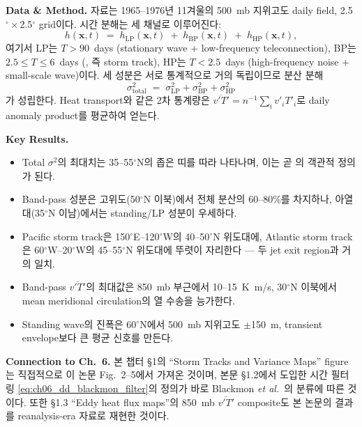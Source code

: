 \medskip
\noindent\textbf{Data \& Method.}\quad
자료는 1965--1976년 11겨울의 500~mb 지위고도 daily field, 2.5$^\circ\times$2.5$^\circ$ grid이다.
시간 분해는 세 채널로 이루어진다:
\begin{equation}\label{eq:ch06_dd_blackmon_filter}
  h(\mathbf{x},t) \;=\; h_{\mathrm{LP}}(\mathbf{x},t)
  \;+\; h_{\mathrm{BP}}(\mathbf{x},t)
  \;+\; h_{\mathrm{HP}}(\mathbf{x},t),
\end{equation}
여기서 LP는 $T>90$~days (stationary wave + low-frequency teleconnection),
BP는 $2.5\le T\le 6$~days (, 즉 storm track),
HP는 $T<2.5$~days (high-frequency noise + small-scale wave)이다.
세 성분은 서로 통계적으로 거의 독립이므로 분산 분해
\begin{equation}\label{eq:ch06_dd_blackmon_variance}
  \sigma^2_{\text{total}}
  \;=\; \sigma^2_{\mathrm{LP}}
  + \sigma^2_{\mathrm{BP}}
  + \sigma^2_{\mathrm{HP}}
\end{equation}
가 성립한다.  Heat transport와 같은 2차 통계량은
$\overline{v'T'} = n^{-1}\sum_i v'_i T'_i$로 daily anomaly product를 평균하여 얻는다.

\medskip
\noindent\textbf{Key Results.}
\begin{itemize}
  \item Total $\sigma^2$의 최대치는 35--55$^\circ$N의 좁은 띠를 따라 나타나며,
        이는 곧 의 객관적 정의가 된다.
  \item Band-pass 성분은 고위도(50$^\circ$N 이북)에서 전체 분산의 60--80\%를 차지하나,
        아열대(35$^\circ$N 이남)에서는 standing/LP 성분이 우세하다.
  \item Pacific storm track은 150$^\circ$E--120$^\circ$W의 40--50$^\circ$N 위도대에,
        Atlantic storm track은 60$^\circ$W--20$^\circ$W의 45--55$^\circ$N 위도대에
        뚜렷이 자리한다 --- 두 jet exit region과 거의 일치.
  \item Band-pass $\overline{v'T'}$의 최대값은 850~mb 부근에서 10--15~K~m/s,
        30$^\circ$N 이북에서 mean meridional circulation의 열 수송을 능가한다.
  \item Standing wave의 진폭은 60$^\circ$N에서 500~mb 지위고도 $\pm$150~m,
        transient envelope보다 큰 평균 신호를 만든다.
\end{itemize}

\medskip
\noindent\textbf{Connection to Ch.~6.}\quad
본 챕터 \S1의 ``Storm Tracks and Variance Maps'' figure는 직접적으로 이 논문 Fig.~2--5에서
가져온 것이며, 본문 \S1.2에서 도입한 시간 필터링 \eqref{eq:ch06_dd_blackmon_filter}의 정의가
바로 Blackmon \emph{et al.}\ 의 분류에 따른 것이다.  또한 \S1.3 ``Eddy heat flux maps''의
850~mb $\overline{v'T'}$ composite도 본 논문의 결과를 reanalysis-era 자료로 재현한 것이다.

